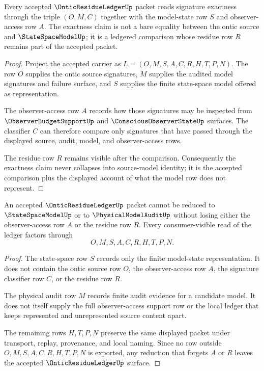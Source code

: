 \begin{theorem}
\label{thm:ontic-residue-ledger-signature-exactness}
Every accepted $\OnticResidueLedgerUp$ packet reads signature exactness through the triple $(O,M,C)$ together with the model-state row $S$ and observer-access row $A$. The exactness claim is not a bare equality between the ontic source and $\StateSpaceModelUp$; it is a ledgered comparison whose residue row $R$ remains part of the accepted packet.
\end{theorem}
\begin{proof}
Project the accepted carrier as $L=(O,M,S,A,C,R,H,T,P,N)$. The row $O$ supplies the ontic source signatures, $M$ supplies the audited model signatures and failure surface, and $S$ supplies the finite state-space model offered as representation.

The observer-access row $A$ records how those signatures may be inspected from $\ObserverBudgetSupportUp$ and $\ConsciousObserverStateUp$ surfaces. The classifier $C$ can therefore compare only signatures that have passed through the displayed source, audit, model, and observer-access rows.

The residue row $R$ remains visible after the comparison. Consequently the exactness claim never collapses into source-model identity; it is the accepted comparison plus the displayed account of what the model row does not represent.
\end{proof}

\begin{theorem}
\label{thm:ontic-residue-ledger-nonescape}
An accepted $\OnticResidueLedgerUp$ packet cannot be reduced to $\StateSpaceModelUp$ or to $\PhysicalModelAuditUp$ without losing either the observer-access row $A$ or the residue row $R$. Every consumer-visible read of the ledger factors through
$$
O,M,S,A,C,R,H,T,P,N.
$$
\end{theorem}
\begin{proof}
The state-space row $S$ records only the finite model-state representation. It does not contain the ontic source row $O$, the observer-access row $A$, the signature classifier row $C$, or the residue row $R$.

The physical audit row $M$ records finite audit evidence for a candidate model. It does not itself supply the full observer-access support row or the local ledger that keeps represented and unrepresented source content apart.

The remaining rows $H,T,P,N$ preserve the same displayed packet under transport, replay, provenance, and local naming. Since no row outside $O,M,S,A,C,R,H,T,P,N$ is exported, any reduction that forgets $A$ or $R$ leaves the accepted $\OnticResidueLedgerUp$ surface.
\end{proof}

